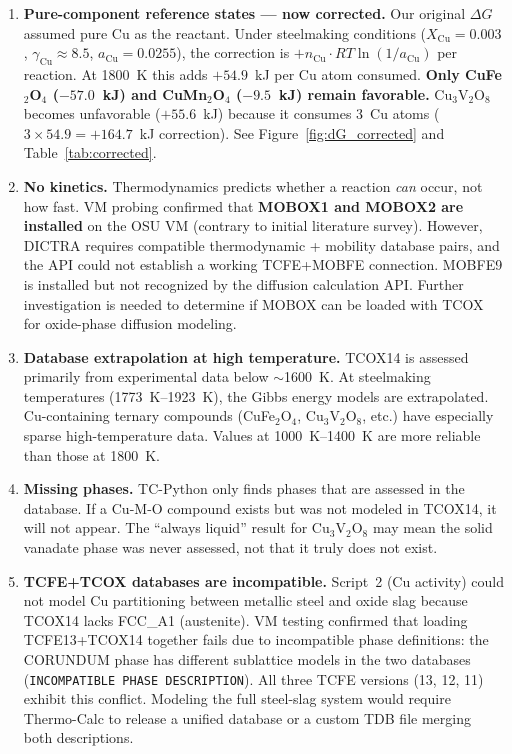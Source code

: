 \documentclass[11pt]{article}
\begin{document}
\begin{enumerate}[leftmargin=*]
    \item \textbf{Pure-component reference states --- now corrected.} Our original $\Delta G$ assumed pure Cu as the reactant. Under steelmaking conditions ($X_{\text{Cu}} = 0.003$, $\gamma_{\text{Cu}} \approx 8.5$, $a_{\text{Cu}} = 0.0255$), the correction is $+n_{\text{Cu}} \cdot RT\ln(1/a_{\text{Cu}})$ per reaction. At \SI{1800}{\kelvin} this adds $+54.9$~kJ per Cu atom consumed. \textbf{Only CuFe$_2$O$_4$ ($-57.0$~kJ) and CuMn$_2$O$_4$ ($-9.5$~kJ) remain favorable.} Cu$_3$V$_2$O$_8$ becomes unfavorable ($+55.6$~kJ) because it consumes 3~Cu atoms ($3 \times 54.9 = +164.7$~kJ correction). See Figure~\ref{fig:dG_corrected} and Table~\ref{tab:corrected}.

    \item \textbf{No kinetics.} Thermodynamics predicts whether a reaction \textit{can} occur, not how fast. VM probing confirmed that \textbf{MOBOX1 and MOBOX2 are installed} on the OSU VM (contrary to initial literature survey). However, DICTRA requires compatible thermodynamic + mobility database pairs, and the API could not establish a working TCFE+MOBFE connection. MOBFE9 is installed but not recognized by the diffusion calculation API. Further investigation is needed to determine if MOBOX can be loaded with TCOX for oxide-phase diffusion modeling.

    \item \textbf{Database extrapolation at high temperature.} TCOX14 is assessed primarily from experimental data below $\sim$\SI{1600}{\kelvin}. At steelmaking temperatures (\SIrange{1773}{1923}{\kelvin}), the Gibbs energy models are extrapolated. Cu-containing ternary compounds (CuFe$_2$O$_4$, Cu$_3$V$_2$O$_8$, etc.) have especially sparse high-temperature data. Values at \SIrange{1000}{1400}{\kelvin} are more reliable than those at \SI{1800}{\kelvin}.

    \item \textbf{Missing phases.} TC-Python only finds phases that are assessed in the database. If a Cu-M-O compound exists but was not modeled in TCOX14, it will not appear. The ``always liquid'' result for Cu$_3$V$_2$O$_8$ may mean the solid vanadate phase was never assessed, not that it truly does not exist.

    \item \textbf{TCFE+TCOX databases are incompatible.} Script~2 (Cu activity) could not model Cu partitioning between metallic steel and oxide slag because TCOX14 lacks FCC\_A1 (austenite). VM testing confirmed that loading TCFE13+TCOX14 together fails due to incompatible phase definitions: the CORUNDUM phase has different sublattice models in the two databases (\texttt{INCOMPATIBLE PHASE DESCRIPTION}). All three TCFE versions (13, 12, 11) exhibit this conflict. Modeling the full steel-slag system would require Thermo-Calc to release a unified database or a custom TDB file merging both descriptions.


\end{enumerate}
\end{document}
